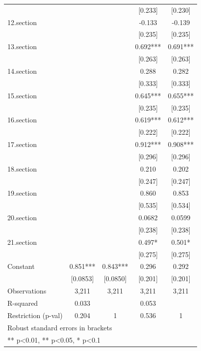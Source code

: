 \begin{tabular}{lcccc}
 &  &  & [0.233] & [0.230] \\
12.section &  &  & -0.133 & -0.139 \\
 &  &  & [0.235] & [0.235] \\
13.section &  &  & 0.692*** & 0.691*** \\
 &  &  & [0.263] & [0.263] \\
14.section &  &  & 0.288 & 0.282 \\
 &  &  & [0.333] & [0.333] \\
15.section &  &  & 0.645*** & 0.655*** \\
 &  &  & [0.235] & [0.235] \\
16.section &  &  & 0.619*** & 0.612*** \\
 &  &  & [0.222] & [0.222] \\
17.section &  &  & 0.912*** & 0.908*** \\
 &  &  & [0.296] & [0.296] \\
18.section &  &  & 0.210 & 0.202 \\
 &  &  & [0.247] & [0.247] \\
19.section &  &  & 0.860 & 0.853 \\
 &  &  & [0.535] & [0.534] \\
20.section &  &  & 0.0682 & 0.0599 \\
 &  &  & [0.238] & [0.238] \\
21.section &  &  & 0.497* & 0.501* \\
 &  &  & [0.275] & [0.275] \\
Constant & 0.851*** & 0.843*** & 0.296 & 0.292 \\
 & [0.0853] & [0.0850] & [0.201] & [0.201] \\
\midrule
Observations & 3,211 & 3,211 & 3,211 & 3,211 \\
R-squared & 0.033 &  & 0.053 &  \\
Restriction (p-val) & 0.204 & 1 & 0.536 & 1 \\
\bottomrule
\multicolumn{5}{l}{\footnotesize Robust standard errors in brackets} \\
\multicolumn{5}{l}{\footnotesize *** p<0.01, ** p<0.05, * p<0.1} \\
\end{tabular}
